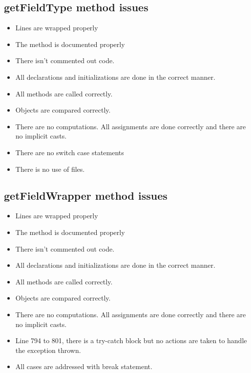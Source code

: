 \subsection{getFieldType method issues}
\begin{itemize}
	\item Lines are wrapped properly
	\item The method is documented properly
	\item There isn't commented out code.
	\item All declarations and initializations are done in the correct manner.
	\item All methods are called correctly.
	\item Objects are compared correctly.
	\item There are no computations. All assignments are done correctly and there are no implicit casts.
	\item There are no switch case statements
	\item There is no use of files.
\end{itemize}

\subsection{getFieldWrapper method issues}
\begin{itemize}
	\item Lines are wrapped properly
	\item The method is documented properly
	\item There isn't commented out code.
	\item All declarations and initializations are done in the correct manner.
	\item All methods are called correctly.
	\item Objects are compared correctly.
	\item There are no computations. All assignments are done correctly and there are no implicit casts.
	\item Line 794 to 801, there is a try-catch block but no actions are taken to handle the exception thrown.
	\item All cases are addressed with break statement.
\end{itemize}